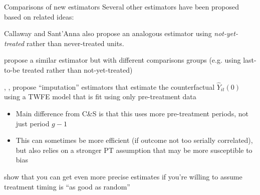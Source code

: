 \documentclass[usenames, dvipsnames, aspectratio = 169, 13pt]{beamer}
\newenvironment{wideitemize}{\itemize\addtolength{\itemsep}{10pt}}{\enditemize}
\begin{document}
\begin{frame}{Comparisons of new estimators}
Several other estimators have been proposed based on related ideas: 

\begin{wideitemize}
    \item
    Callaway and Sant'Anna also propose an analogous estimator using \textit{not-yet-treated} rather than never-treated units. 
    
    \item
    \citet{sun_estimating_2020} propose a similar estimator but with different comparisons groups (e.g. using last-to-be treated rather than not-yet-treated)
    
    \item
    \citet{borusyak_revisiting_2021}, \citet{Wooldridge2021a}, \citet{gardner_two-stage_2021} propose ``imputation'' estimators that estimate the counterfactual $\hat{Y}_{it}(0)$ using a TWFE model that is fit using only pre-treatment data
        \begin{itemize}
            \item 
            Main difference from C\&S is that this uses more pre-treatment periods, not just period $g-1$
            
            \item
            This can sometimes be more efficient (if outcome not too serially correlated), but also relies on a stronger PT assumption that may be more susceptible to bias
        \end{itemize}
        
    \item \citet{roth_efficient_2021} show that you can get even more precise estimates if you're willing to assume treatment timing is ``as good as random''
    
\end{wideitemize}
\end{frame}
\end{document}
